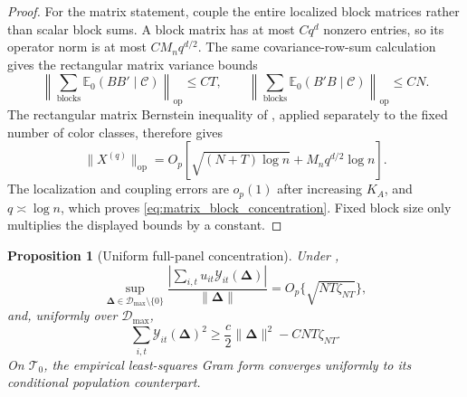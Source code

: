 \documentclass[11pt]{article}
\numberwithin{equation}{section}
\newtheorem{proposition}{Proposition}
\theoremstyle{remark}
\newcommand{\Ezero}{\mathbb E_0}
\newcommand{\op}{\operatorname{op}}
\newcommand{\bDelta}{\bm\Delta}
\newcommand{\calD}{\mathcal D}
\newcommand{\calT}{\mathcal T}
\begin{document}
\begin{proof}
For the matrix statement, couple the entire localized block matrices rather than scalar block sums. A block matrix has at most $Cq^d$ nonzero entries, so its operator norm is at most $CM_nq^{d/2}$. The same covariance-row-sum calculation gives the rectangular matrix variance bounds
\[
\left\|
\sum_{\text{blocks}}
\Ezero(BB'\mid\mathscr C)
\right\|_{\op}
\le CT,
\qquad
\left\|
\sum_{\text{blocks}}
\Ezero(B'B\mid\mathscr C)
\right\|_{\op}
\le CN.
\]
The rectangular matrix Bernstein inequality of \citet{tropp2012}, applied separately to the fixed number of color classes, therefore gives
\[
\|X^{(q)}\|_{\op}
=
O_p\!\left[
\sqrt{(N+T)\log n}
+M_nq^{d/2}\log n
\right].
\]
The localization and coupling errors are $o_p(1)$ after increasing $K_A$, and $q\asymp\log n$, which proves \eqref{eq:matrix_block_concentration}. Fixed block size only multiplies the displayed bounds by a constant.
\end{proof}

\begin{proposition}[Uniform full-panel concentration]
\label{prop:uniform_concentration}
Under ,
\begin{equation}
\label{eq:uniform_score_bound}
\sup_{\bDelta\in\calD_{\max}\setminus\{0\}}
\frac{
|\sum_{i,t}u_{it}\mathcal Y_{it}(\bDelta)|
}{
\|\bDelta\|
}
=
O_p\{\sqrt{NT\zeta_{NT}}\},
\end{equation}
and, uniformly over $\calD_{\max}$,
\begin{equation}
\label{eq:empirical_lower_bound}
\sum_{i,t}\mathcal Y_{it}(\bDelta)^2
\ge
\frac c2\|\bDelta\|^2-CNT\zeta_{NT}.
\end{equation}
On $\calT_0$, the empirical least-squares Gram form converges uniformly to its conditional population counterpart.
\end{proposition}
\end{document}
